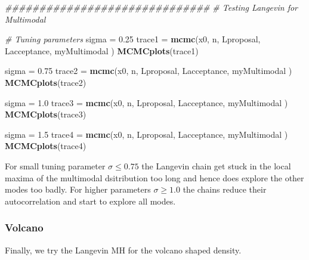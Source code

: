 \documentclass[
]{article}
\newenvironment{Shaded}{\begin{snugshade}}{\end{snugshade}}
\newcommand{\CommentTok}[1]{\textcolor[rgb]{0.56,0.35,0.01}{\textit{#1}}}
\newcommand{\FloatTok}[1]{\textcolor[rgb]{0.00,0.00,0.81}{#1}}
\newcommand{\KeywordTok}[1]{\textcolor[rgb]{0.13,0.29,0.53}{\textbf{#1}}}
\newcommand{\NormalTok}[1]{#1}
\newcommand{\StringTok}[1]{\textcolor[rgb]{0.31,0.60,0.02}{#1}}
\begin{document}
\begin{Shaded}
\begin{Highlighting}[]
\CommentTok{##############################}
\CommentTok{# Testing Langevin for Multimodal}

\CommentTok{# Tuning parameters}
\NormalTok{sigma =}\StringTok{ }\FloatTok{0.25}
\NormalTok{trace1 =}\StringTok{ }\KeywordTok{mcmc}\NormalTok{(x0, n, Lproposal, Lacceptance, myMultimodal )}
\KeywordTok{MCMCplots}\NormalTok{(trace1)}

\NormalTok{sigma =}\StringTok{ }\FloatTok{0.75}
\NormalTok{trace2 =}\StringTok{ }\KeywordTok{mcmc}\NormalTok{(x0, n, Lproposal, Lacceptance, myMultimodal )}
\KeywordTok{MCMCplots}\NormalTok{(trace2)}

\NormalTok{sigma =}\StringTok{ }\FloatTok{1.0}
\NormalTok{trace3 =}\StringTok{ }\KeywordTok{mcmc}\NormalTok{(x0, n, Lproposal, Lacceptance, myMultimodal )}
\KeywordTok{MCMCplots}\NormalTok{(trace3)}

\NormalTok{sigma =}\StringTok{ }\FloatTok{1.5}
\NormalTok{trace4 =}\StringTok{ }\KeywordTok{mcmc}\NormalTok{(x0, n, Lproposal, Lacceptance, myMultimodal )}
\KeywordTok{MCMCplots}\NormalTok{(trace4)}
\end{Highlighting}
\end{Shaded}

For small tuning parameter \(\sigma\leq 0.75\) the Langevin chain get
stuck in the local maxima of the multimodal dsitribution too long and
hence does explore the other modes too badly. For higher parameters
\(\sigma\geq1.0\) the chains reduce their autocorrelation and start to
explore all modes.

\hypertarget{volcano-1}{%
\subsubsection{Volcano}\label{volcano-1}}

Finally, we try the Langevin MH for the volcano shaped density.
\end{document}
